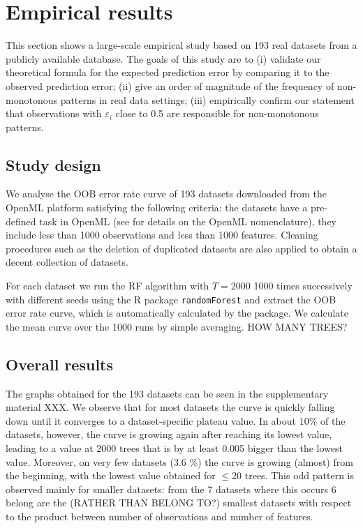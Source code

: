 \documentclass[paper=a4
               ,12pt
               ,DIV=12
               ,parskip=half
               ,titlepage=on
               ,headinclude 
               ,footinclude
               ,headsepline
               ,footsepline         %
               ,ilines 
               ]{scrartcl}
\begin{document}
\section{Empirical results}
\label{sec:empirical}

This section shows a large-scale empirical study based on 193 real datasets from a publicly available database. 
The goals of this study are to (i) validate our theoretical formula for the expected prediction error by comparing it to the observed prediction error; 
(ii) give an order of magnitude of the frequency of non-monotonous patterns in real data settings; 
(iii) empirically confirm our statement that observations with $\varepsilon_i$ close to 0.5 are responsible for non-monotonous patterns. 

\subsection{Study design}

We analyse the OOB error rate curve of 193 datasets downloaded from the OpenML platform \citep{OpenML2013} satisfying the following criteria: the datasets have a pre-defined task in OpenML (see \citet{OpenML2013} for details on the OpenML nomenclature), they include less than 1000 observations and less than 1000 features. Cleaning procedures such as the deletion of duplicated datasets are also applied to obtain a decent collection of datasets. 

For each dataset we run the RF algorithm with $T=2000$ 1000 times successively with different seeds using the R package \texttt{randomForest} \citep{Liaw2002} and extract the OOB error rate curve, which is automatically calculated by the package. 
We calculate the mean curve over the 1000 runs by simple averaging. HOW MANY TREES?

\subsection{Overall results}
The graphs obtained for the 193 datasets can be seen in the supplementary material XXX. 
We observe that for most datasets the curve is quickly falling down until it converges to a dataset-specific plateau value. In about $10\%$ of the datasets, however, the curve is growing again after reaching its lowest value, leading to a value at 2000 trees that is by at least 0.005 bigger than the lowest value. Moreover, on very few datasets (3.6 \%) the curve is growing (almost) from the beginning, with the lowest value obtained for $\leq$20 trees. This odd pattern is observed mainly for smaller datasets: from the 7 datasets where this occurs 6 belong are the (RATHER THAN BELONG TO?) smallest datasets with respect to the product between number of observations and number of features. 
\end{document}
